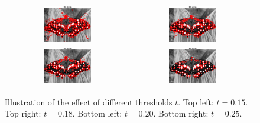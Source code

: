 \begin{figure}[h]
	\centering
	\begin{tabular}{cc}
	\includegraphics[width=0.4\textwidth]{figures/a3_butterfly_k015.png} &
	\includegraphics[width=0.4\textwidth]{figures/a3_butterfly_k018.png} \\
	\includegraphics[width=0.4\textwidth]{figures/a3_butterfly_k020.png} &
	\includegraphics[width=0.4\textwidth]{figures/a3_butterfly_k025.png} \\
	\end{tabular}
	\caption{Illustration of the effect of different thresholds $t$. Top left: $t=0.15$. Top right: $t=0.18$. Bottom left: $t=0.20$. Bottom right: $t=0.25$.}
	\label{fig:a3:thresholds}
\end{figure}

